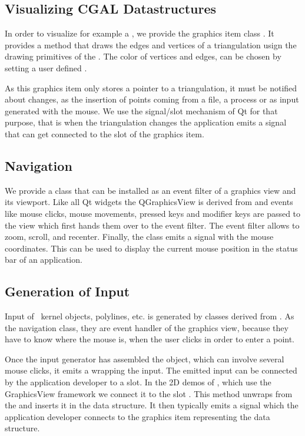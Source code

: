 \subsection{Visualizing CGAL Datastructures}

In order to visualize for example a , we
provide the graphics item class .
It provides a  method that draws the edges and vertices of a triangulation
usign the drawing primitives of the .   The color of vertices and edges, 
can be chosen by setting a user defined  .


As this graphics item only stores a pointer to a triangulation, it
must be notified about changes, as the insertion of points coming from
a file, a process or as input generated with the mouse.  We
use the signal/slot mechanism of Qt for that purpose, that is when the
triangulation changes the application emits a signal that can get connected to the
 slot of the graphics item.



\subsection{Navigation}

We provide a class  that can be
installed as an event filter of a graphics view and its viewport. Like
all Qt widgets the {QGraphicsView} is derived from
 and events like mouse clicks, mouse movements, pressed keys and 
modifier keys are passed to the view which first hands them over to the
event filter.  The  event filter allows to zoom, scroll, and recenter.
Finally, the class emits a signal with the mouse coordinates. This can be used
to display the current mouse position in the status bar of an application.

\subsection{Generation of Input}

Input of \cgal\ kernel objects, polylines, etc. is generated by classes derived
from .  As the navigation class, they are event handler of the
graphics view, because they have to know where the mouse is, when the user clicks
in order to enter a point.

Once the input generator has assembled the object, which can involve several mouse clicks,
it emits a  wrapping the input.  The emitted input can be connected
by the application developer to a slot. In the 2D demos of \cgal, which use the 
GraphicsView framework we connect it to the slot .
This method unwraps from the  and inserts it in the data structure. 
It then typically emits a signal  which the application developer 
connects to the graphics item representing the data structure.

